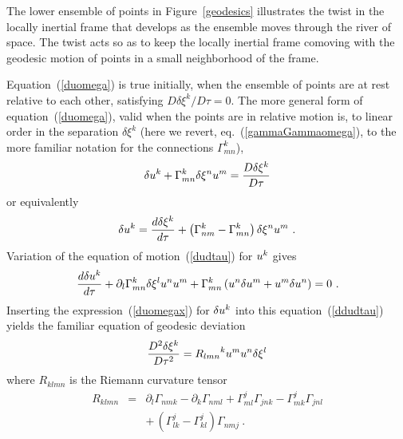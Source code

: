\documentclass[twocolumn,showpacs,preprintnumbers,amsmath,amssymb,prb]{revtex4}
\begin{document}
The lower ensemble of points in Figure~\ref{geodesics}
illustrates the twist in the locally inertial frame
that develops as the ensemble moves through the river of space.
The twist acts so as to keep the locally inertial frame
comoving with the geodesic motion of points
in a small neighborhood of the frame.

Equation~(\ref{duomega}) is true initially,
when the ensemble of points are at rest relative to each other,
satisfying $D \delta \xi^k / D \tau = 0$.
The more general form of equation~(\ref{duomega}),
valid when the points are in relative motion is,
to linear order in the separation $\delta \xi^k$
(here we revert, eq.~(\ref{gammaGammaomega}),
to the more familiar notation for the connections
$\Gamma^k_{mn}$),
\begin{equation}
  \delta u^k + \Gamma^k_{mn} \delta \xi^n u^m
  =
  {D \delta \xi^k \over D \tau}
\end{equation}
or equivalently
\begin{equation}
\label{duomegax}
  \delta u^k =
  {d \delta \xi^k \over d \tau}
  + \left( \Gamma^k_{nm} - \Gamma^k_{mn} \right) \delta \xi^n u^m
  \ .
\end{equation}
Variation of the equation of motion~(\ref{dudtau}) for $u^k$ gives
\begin{equation}
\label{ddudtau}
  {d\delta u^k \over d\tau}
  + \partial_l \Gamma^k_{mn} \delta \xi^l u^n u^m
  + \Gamma^k_{mn} \left( u^n \delta u^m + u^m \delta u^n \right)
  = 0
  \ .
\end{equation}
Inserting the expression~(\ref{duomegax}) for $\delta u^k$
into this equation~(\ref{ddudtau}) yields the familiar equation
of geodesic deviation
\begin{equation}
  {D^2 \delta \xi^k \over D \tau^2}
  =
  {R_{lmn}}^k u^m u^n \delta \xi^l
\end{equation}
where
$R_{klmn}$
is the Riemann curvature tensor
\begin{eqnarray}
  R_{klmn}
  &=&
  \partial_l \Gamma_{nmk} - \partial_k \Gamma_{nml}
  + \Gamma^j_{ml} \Gamma_{jnk} - \Gamma^j_{mk} \Gamma_{jnl}
\nonumber
\\
  &&
  + \, ( \Gamma^j_{lk} - \Gamma^j_{kl} ) \Gamma_{nmj}
  \ .
\end{eqnarray}

\end{document}
